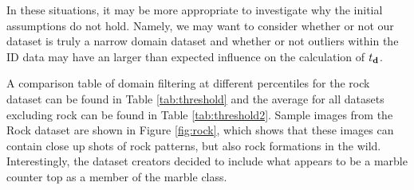 \documentclass[letterpaper]{article} %
\theoremstyle{plain}
\theoremstyle{definition}
\theoremstyle{remark}
\begin{document}
In these situations, it may be more appropriate to investigate why the initial assumptions do not hold. Namely, we may want to consider whether or not our dataset is truly a narrow domain dataset and whether or not outliers within the ID data may have an larger than expected influence on the calculation of $t_{\mathbf{d}}$.

A comparison table of domain filtering at different percentiles for the rock dataset can be found in Table \ref{tab:threshold} and the average for all datasets excluding rock can be found in Table \ref{tab:threshold2}. Sample images from the Rock dataset are shown in Figure \ref{fig:rock}, which shows that these images can contain close up shots of rock patterns, but also rock formations in the wild. Interestingly, the dataset creators decided to include what appears to be a marble counter top as a member of the marble class. 

\label{percentile}
\end{document}
